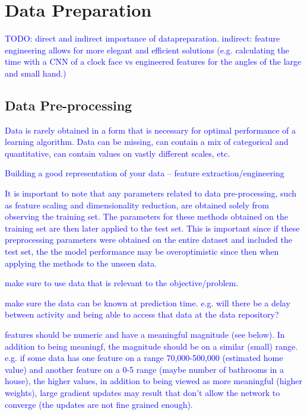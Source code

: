 \section{Data Preparation}

\textcolor{blue}{TODO: direct and indirect importance of datapreparation. indirect: feature engineering allows for more elegant and efficient solutions (e.g. calculating the time with a CNN of a clock face vs engineered features for the angles of the large and small hand.) }

\subsection{Data Pre-processing}

\textcolor{blue}{Data is rarely obtained in a form that is necessary for optimal performance of a learning algorithm. Data can be missing, can contain a mix of categorical and quantitative, can contain values on vastly different scales, etc.}

\textcolor{blue}{Building a good representation of your data -- feature extraction/engineering}

\textcolor{blue}{It is important to note that any parameters related to data pre-processing, such as feature scaling and dimensionality reduction, are obtained solely from observing the training set. The parameters for these methods obtained on the training set are then later applied to the test set. This is important since if these preprocessing parameters were obtained on the entire dataset and included the test set, the the model performance may be overoptimistic since then when applying the methods to the unseen data.}

\textcolor{blue}{make sure to use data that is relevant to the objective/problem.}


\textcolor{blue}{make sure the data can be known at prediction time. e.g. will there be a delay between activity and being able to access that data at the data repository?}


\textcolor{blue}{features should be numeric and have a meaningful magnitude (see below). In addition to being meaningf, the magnitude should be on a similar (small) range. e.g. if some data has one feature on a range 70,000-500,000 (estimated home value) and another feature on a 0-5 range (maybe number of bathrooms in a house), the higher values, in addition to being viewed as more meaningful (higher weights), large gradient updates may result that don't allow the network to converge (the updates are not fine grained enough).}

